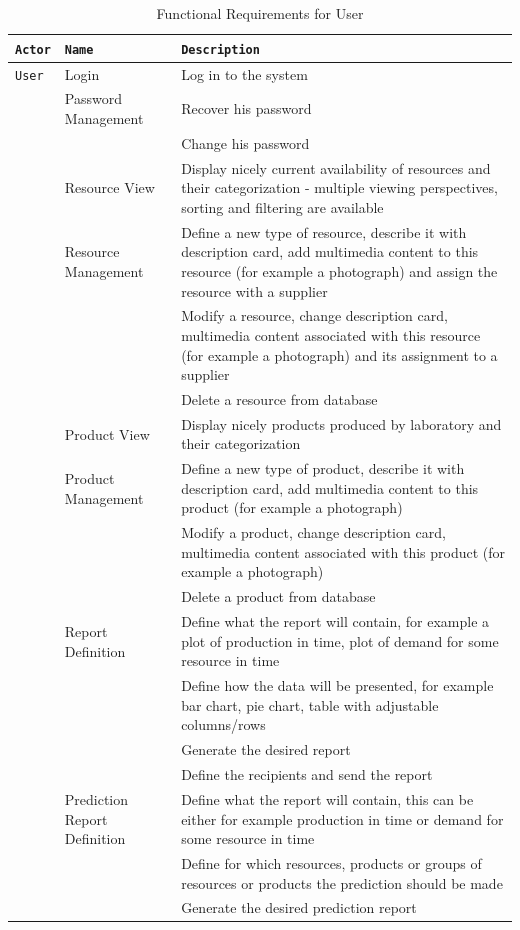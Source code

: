 \documentclass[a4paper,11pt,twoside]{report}
\theoremstyle{definition}
\begin{document}
\begin{longtable}{|p{3cm}|p{3cm}|p{10cm}|}
\caption[Functional Requirements for User]{Functional Requirements for User}
\label{functional requirements user}
\tabularnewline

\hline
\texttt{Actor} & \texttt{Name} & \texttt{Description} \\ \hline
\texttt{User} & Login & Log in to the system\\  \cline{2-3}
\texttt{} & Password Management & Recover his password\\  \cline{3-3}
\texttt{} & & Change his password\\ \cline{2-3}

\texttt{} & Resource View & Display nicely current availability of resources and their categorization - multiple viewing perspectives, sorting and filtering are available\\ \cline{2-3}
\texttt{} & Resource Management & Define a new type of resource, describe it with description card, add multimedia content to this resource (for example a photograph) and assign the resource with a supplier\\ \cline{3-3}
\texttt{} & & Modify a resource, change description card, multimedia content associated with this resource (for example a photograph) and its assignment to a supplier\\ \cline{3-3}
\texttt{} & & Delete a resource from database\\ \cline{2-3}

\texttt{} & Product View & Display nicely products produced by laboratory and their categorization\\ \cline{2-3}
\texttt{} & Product Management & Define a new type of product, describe it with description card, add multimedia content to this product (for example a photograph)\\ \cline{3-3}
\texttt{} & & Modify a product, change description card, multimedia content associated with this product (for example a photograph)\\ \cline{3-3}
\texttt{} & & Delete a product from database\\ \cline{2-3}
\texttt{} & Report Definition & Define what the report will contain, for example a plot of production in time, plot of demand for some resource in time\\ \cline{3-3}
\texttt{} &  & Define how the data will be presented, for example bar chart, pie chart, table with adjustable columns/rows \\ \cline{3-3}
\texttt{} &  & Generate the desired report \\ \cline{3-3}
\texttt{} &  & Define the recipients and send the report \\ \cline{2-3}
\texttt{} & Prediction Report Definition & Define what the report will contain, this can be either for example production in time or demand for some resource in time\\ \cline{3-3}
\texttt{} &  & Define for which resources, products or groups of resources or products the prediction should be made\\ \cline{3-3}
\texttt{} &  & Generate the desired prediction report \\ \cline{3-3}


\end{longtable}
\end{document}
